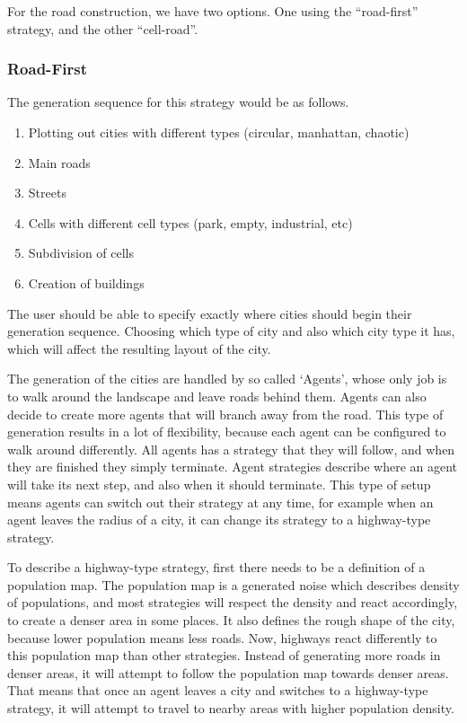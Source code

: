For the road construction, we have two options.
One using the “road-first” strategy, and the other “cell-road”.

\subsubsection{Road-First}
The generation sequence for this strategy would be as follows.
\begin{enumerate}
  \item Plotting out cities with different types (circular, manhattan, chaotic)
  \item Main roads
  \item Streets
  \item Cells with different cell types (park, empty, industrial, etc)
  \item Subdivision of cells
  \item Creation of buildings
\end{enumerate}

The user should be able to specify exactly where cities should begin their generation sequence.
Choosing which type of city
and also which city type it has, which will affect the resulting layout of the city.

The generation of the cities are handled by so called `Agents', whose only job is to walk around the landscape and leave roads behind them.
Agents can also decide to create more agents that will branch away from the road.
This type of generation results in a lot of flexibility, because each agent can be configured to walk around differently.
All agents has a strategy that they will follow, and when they are finished they simply terminate.
Agent strategies describe where an agent will take its next step, and also when it should terminate.
This type of setup means agents can switch out their strategy at any time, for example when an agent leaves the radius of a city, it can change its strategy to a highway-type strategy.

To describe a highway-type strategy, first there needs to be a definition of a population map. The population map is a generated noise which describes density of populations, and most strategies
will respect the density and react accordingly, to create a denser area in some places. It also defines the rough shape of the city, because lower population means less roads.
Now, highways react differently to this population map than other strategies. Instead of generating more roads in denser areas, it will attempt to follow the population map towards denser areas.
That means that once an agent leaves a city and switches to a highway-type strategy, it will attempt to travel to nearby areas with higher population density.

